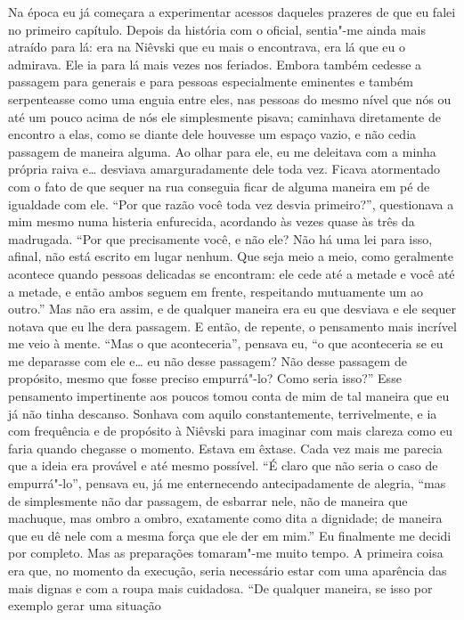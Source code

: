 Na época eu já começara a experimentar acessos daqueles prazeres de que
eu falei no primeiro capítulo. Depois da história com o oficial,
sentia"-me ainda mais atraído para lá: era na Niêvski que eu mais o
encontrava, era lá que eu o admirava. Ele ia para lá mais vezes nos
feriados. Embora também cedesse a passagem para generais e para pessoas
especialmente eminentes e também serpenteasse como uma enguia entre
eles, nas pessoas do mesmo nível que nós ou até um pouco acima de nós
ele simplesmente pisava; caminhava diretamente de encontro a elas, como
se diante dele houvesse um espaço vazio, e não cedia passagem de
maneira alguma. Ao olhar para ele, eu me deleitava com a minha própria
raiva e\ldots{} desviava amarguradamente dele toda vez. Ficava atormentado
com o fato de que sequer na rua conseguia ficar de alguma maneira em pé
de igualdade com ele. ``Por que razão você toda vez desvia primeiro?'',
questionava a mim mesmo numa histeria enfurecida, acordando às vezes
quase às três da madrugada. ``Por que precisamente você, e não ele? Não
há uma lei para isso, afinal, não está escrito em lugar nenhum. Que
seja meio a meio, como geralmente acontece quando pessoas delicadas se
encontram: ele cede até a metade e você até a metade, e então ambos
seguem em frente, respeitando mutuamente um ao outro.'' Mas não era
assim, e de qualquer maneira era eu que desviava e ele sequer notava
que eu lhe dera passagem. E então, de repente, o pensamento mais
incrível me veio à mente. ``Mas o que aconteceria'', pensava eu, ``o que
aconteceria se eu me deparasse com ele e\ldots{} eu não desse passagem? Não
desse passagem de propósito, mesmo que fosse preciso empurrá"-lo? Como
seria isso?'' Esse pensamento impertinente aos poucos tomou conta de
mim de tal maneira que eu já não tinha descanso. Sonhava com aquilo
constantemente, terrivelmente, e ia com frequência e de propósito à
Niêvski para imaginar com mais clareza como eu faria quando chegasse o
momento. Estava em êxtase. Cada vez mais me parecia que a ideia era
provável e até mesmo possível. ``É claro que não seria o caso de
empurrá"-lo'', pensava eu, já me enternecendo antecipadamente de alegria,
``mas de simplesmente não dar passagem, de esbarrar nele, não de maneira
que machuque, mas ombro a ombro, exatamente como dita a dignidade; de
maneira que eu dê nele com a mesma força que ele der em mim.'' Eu
finalmente me decidi por completo. Mas as preparações tomaram"-me muito
tempo. A primeira coisa era que, no momento da execução, seria
necessário estar com uma aparência das mais dignas e com a roupa mais
cuidadosa. ``De qualquer maneira, se isso por exemplo gerar uma situação
